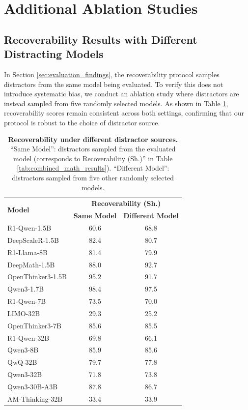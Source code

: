 \documentclass{article} %
\begin{document}
\newpage

\section{Additional Ablation Studies}



\subsection{Recoverability Results with Different Distracting Models}
In Section \ref{sec:evaluation_findings}, the recoverability protocol samples distractors from the same model being evaluated. To verify this does not introduce systematic bias, we conduct an ablation study where distractors are instead sampled from five randomly selected models. As shown in Table \ref{tab:ablation_recoverability_comparison}, recoverability scores remain consistent across both settings, confirming that our protocol is robust to the choice of distractor source.

\begin{table}[H]
  \centering
  \begin{tabular}{lcc}
    \toprule
    \multirow{2}{*}{\textbf{Model}} & \multicolumn{2}{c}{\textbf{Recoverability (Sh.)}} \\
     & \textbf{Same Model} & \textbf{Different Model} \\
    \midrule
    R1-Qwen-1.5B  & 60.6 & 68.8 \\
    DeepScaleR-1.5B       & 82.4 & 80.7 \\
    R1-Llama-8B           & 81.4 & 79.9 \\
    DeepMath-1.5B         & 88.0 & 92.7 \\
    OpenThinker3-1.5B     & 95.2 & 91.7 \\
    Qwen3-1.7B            & 98.4 & 97.5 \\
    \midrule
    R1-Qwen-7B    & 73.5 & 70.0 \\
    LIMO-32B              & 29.3 & 25.2 \\
    OpenThinker3-7B       & 85.6 & 85.5 \\
    R1-Qwen-32B   & 69.8 & 66.1 \\
    \midrule
    Qwen3-8B              & 85.9 & 85.6 \\
    QwQ-32B               & 79.7 & 77.8 \\
    Qwen3-32B             & 71.8 & 73.8 \\
    Qwen3-30B-A3B         & 87.8 & 86.7 \\
    AM-Thinking-32B       & 33.4 & 33.9 \\
    \bottomrule
  \end{tabular}
  \caption{\textbf{Recoverability under different distractor sources.} ``Same Model'': distractors sampled from the evaluated model (corresponds to Recoverability (Sh.)'' in Table \ref{tab:combined_math_results}). ``Different Model'': distractors sampled from five other randomly selected models.}
  \label{tab:ablation_recoverability_comparison}
\end{table}
\end{document}
